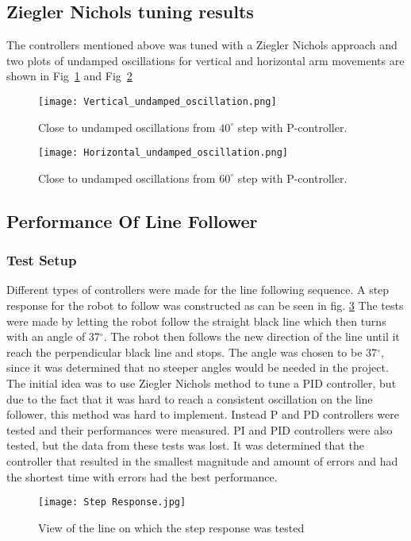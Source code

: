 \subsection{Ziegler Nichols tuning results}
The controllers mentioned above was tuned with a Ziegler Nichols approach and two plots of undamped oscillations for vertical and horizontal arm movements are shown in Fig~\ref{vert_osc} and Fig~\ref{Hor_osc}
\begin{figure}[H]
\centering
\texttt{[image: Vertical\_undamped\_oscillation.png]}
\caption{Close to undamped oscillations from \(40^{\circ}\) step with P-controller.}
\label{vert_osc}
\end{figure}
\begin{figure}[H]
\centering
\texttt{[image: Horizontal\_undamped\_oscillation.png]}
\caption{Close to undamped oscillations from \(60^{\circ}\) step with P-controller.}
\label{Hor_osc}
\end{figure}
\subsection{Performance Of Line Follower}

\subsubsection{Test Setup}
Different types of controllers were made for the line following sequence.  A step response for the robot to follow was constructed as can be seen in fig. \ref{Step Response} The tests were made by letting the robot follow the straight black line which then turns with an angle of 37$^{\circ}$. The robot then follows the new direction of the line until it reach the perpendicular black line and stops. The angle was chosen to be 37$^{\circ}$, since it was determined that no steeper angles would be needed in the project. The initial idea was to use Ziegler Nichols method to tune a PID controller, but due to the fact that it was hard to reach a consistent oscillation on the line follower, this method was hard to implement. Instead P and PD controllers were tested and their performances were measured. PI and PID controllers were also tested, but the data from these tests was lost. It was determined that the controller that resulted in the smallest magnitude and amount of errors and had the shortest time with errors had the best performance. 


\begin{figure}[H]
    \centering
    \texttt{[image: Step Response.jpg]}
    \caption{View of the line on which the step response was tested}
    \label{Step Response}
\end{figure}

